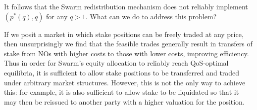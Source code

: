 It follows that the Swarm redistribution mechanism does not reliably implement $(p^*(q),q)$ for any $q>1$.
%
What can we do to address this problem?

If we posit a market in which stake positions can be freely traded at any price, then unsurprisingly we find that the feasible trades generally result in transfers of stake from NOs with higher costs to those with lower costs, improving efficiency.
%
Thus in order for Swarm's equity allocation to reliably reach QoS-optimal equilibria, it is sufficient to allow stake positions to be transferred and traded under arbitrary market structures.
%
However, this is not the only way to achieve this: for example, it is also sufficient to allow stake to be liquidated so that it may then be reissued to another party with a higher valuation for the position.



